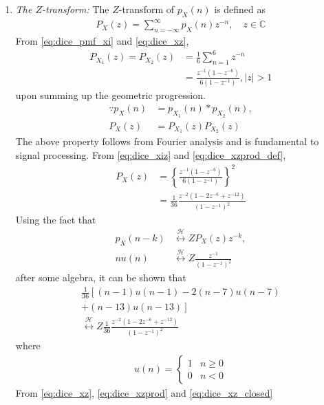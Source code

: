 \documentclass{article}
\numberwithin{equation}{subsection}
\numberwithin{figure}{subsection}
\providecommand{\cbrak}[1]{\ensuremath{\left\{#1\right\}}}
\providecommand{\brak}[1]{\ensuremath{\left(#1\right)}}
\providecommand{\lsbrak}[1]{\ensuremath{{}\left[#1\right.}}
\providecommand{\rsbrak}[1]{\ensuremath{{}\left.#1\right]}}
\providecommand{\system}{\overset{\mathcal{H}}{ \longleftrightarrow}}
\providecommand{\abs}[1]{\left\vert#1\right\vert}
\renewcommand\thesection{\arabic{section}}
\renewcommand\thesubsection{\thesection.\arabic{subsection}}
\begin{document}
\begin{enumerate}[label=\thesubsection.\arabic*.,ref=\thesubsection.\arabic{figure}]
\begin{center}
\end{center}
\item {\em The $Z$-transform: }
The $Z$-transform of $p_X(n)$ is defined as 
\begin{align}
P_X(z) = \sum_{n = -\infty}^{\infty}p_X(n)z^{-n}, \quad z \in \mathbb{C}
\label{eq:dice_xz}
\end{align}
%
From \eqref{eq:dice_pmf_xi} and \eqref{eq:dice_xz}, 
\begin{align}
P_{X_1}(z) =P_{X_2}(z) &= \frac{1}{6}\sum_{n = 1}^{6}z^{-n}
\\
&=\frac{z^{-1}\brak{1-z^{-6}}}{6\brak{1-z^{-1}}},  \abs{z} >1
\label{eq:dice_xiz}
\end{align}
upon summing up the geometric progression.  
\begin{align}
\because p_X(n) &= p_{X_1}(n)*p_{X_2}(n),
\\
P_X(z) &= P_{X_1}(z)P_{X_2}(z)
\label{eq:dice_xzprod_def}
\end{align}
The above property follows from Fourier analysis and is fundamental to signal processing. 
From \eqref{eq:dice_xiz} and \eqref{eq:dice_xzprod_def},
\begin{align}
P_X(z) &= \cbrak{\frac{z^{-1}\brak{1-z^{-6}}}{6\brak{1-z^{-1}}}}^2
\\
&= \frac{1}{36}\frac{z^{-2}\brak{1-2z^{-6}+z^{-12}}}{\brak{1-z^{-1}}^2}
\label{eq:dice_xzprod}
\end{align}
Using the fact that 
\begin{align}
p_X(n-k) &\system{Z}P_X(z)z^{-k},
\\
nu(n)&\system{Z} \frac{z^{-1}}{\brak{1-z^{-1}}^2}
\end{align}
after some algebra, it can be shown that
\begin{multline}
\frac{1}{36}\lsbrak{\brak{n-1}u(n-1) - 2 \brak{n-7}u(n-7)}
\\
\rsbrak{ +\brak{n-13}u(n-13)}
\\
\system{Z}
\frac{1}{36}\frac{z^{-2}\brak{1-2z^{-6}+z^{-12}}}{\brak{1-z^{-1}}^2}
\label{eq:dice_xz_closed}
\end{multline}
where 
\begin{align}
u(n) =
\begin{cases}
1 & n \ge 0
\\
0 & n < 0
\end{cases}
\end{align}
From \eqref{eq:dice_xz}, \eqref{eq:dice_xzprod} and \eqref{eq:dice_xz_closed}
\begin{multline}

\end{multline}
\end{enumerate}
\end{document}
